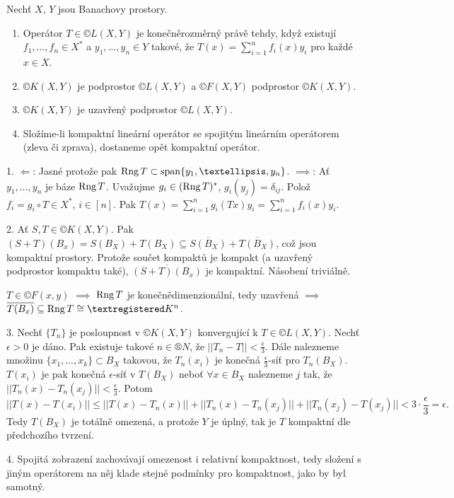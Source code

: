 \documentclass[12pt]{article}					%
\begin{document}
\begin{veta}
	Nechť $X$, $Y$ jsou Banachovy prostory.

	\begin{enumerate}
		\item Operátor $T \in ©L(X, Y)$ je konečněrozměrný právě tehdy, když existují $f_1, …, f_n \in X^*$ a $y_1, …, y_n \in Y$ takové, že $T(x) = \sum_{i = 1}^n f_i(x)y_i$ pro každé $x \in X$.
		\item $©K(X, Y)$ je podprostor $©L(X, Y)$ a $©F(X, Y)$ podprostor $©K(X, Y)$.
		\item $©K(X, Y)$ je uzavřený podprostor $©L(X, Y)$.
		\item Složíme-li kompaktní lineární operátor se spojitým lineárním operátorem (zleva či zprava), dostaneme opět kompaktní operátor.
	\end{enumerate}

	\begin{dukazin}
		1. $\Leftarrow$: Jasné protože pak $\Rang T \subset \spn\{y_1, …, y_n\}$. $\implies$: Ať $y_1, …, y_n$ je báze $\operatorname{Rng} T$. Uvažujme $g_i \in (\operatorname{Rng} T)^*$, $g_i(y_j) = \delta_{ij}$. Polož $f_i = g_i \circ T \in X^*$, $i \in [n]$. Pak $T(x) = \sum_{i=1}^n g_i(Tx)y_i = \sum_{i=1}^n f_i(x)y_i$.

		2. Ať $S, T \in ©K(X, Y)$. Pak $(S + T)(B_x) = S(B_X) + T(B_X) \subseteq \overline{S(B_X)} + \overline{T(B_X)}$, což jsou kompaktní prostory. Protože součet kompaktů je kompakt (a uzavřený podprostor kompaktu také), $\overline{(S + T)(B_x)}$ je kompaktní. Násobení triviálně.

		$T \in ©F(x, y)$ $\implies$ $\operatorname{Rng} T$ je konečnědimenzionální, tedy uzavřená $\implies$ $\overline{T(B_x)} \subseteq \Rang T \cong ®K^n$.
	\end{dukazin}

	\begin{dukazin}
		3. Nechť $\{T_n\}$ je posloupnost v $©K(X, Y)$ konvergující k $T \in ©L(X, Y)$. Nechť $\epsilon > 0$ je dáno. Pak existuje takové $n \in ®N$, že $||T_n - T|| < \frac{\epsilon}{3}$. Dále nalezneme množinu $\{x_1, …, x_k\}\subset B_X$ takovou, že $T_n(x_i)$ je konečná $\frac{\epsilon}{3}$-síť pro $T_n(B_X)$. $T(x_i)$ je pak konečná $\epsilon$-síť v $T(B_X)$ neboť $\forall x \in B_X$ nalezneme $j$ tak, že $||T_n(x) - T_n(x_j)|| < \frac{\epsilon}{3}$. Potom
		$$ ||T(x) - T(x_i)|| ≤ ||T(x) - T_n(x)|| + ||T_n(x) - T_n(x_j)|| + ||T_n(x_j) - T(x_j)|| < 3·\frac{\epsilon}{3} = \epsilon. $$
		Tedy $T(B_X)$ je totálně omezená, a protože $Y$ je úplný, tak je $T$ kompaktní dle předchozího tvrzení.

		4. Spojitá zobrazení zachovávají omezenost i relativní kompaktnost, tedy složení s jiným operátorem na něj klade stejné podmínky pro kompaktnost, jako by byl samotný.
	\end{dukazin}
\end{veta}
\end{document}
